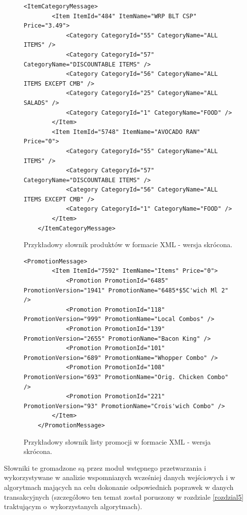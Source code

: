 \documentclass[a4paper]{book}
\begin{document}
\begin{figure}[t]
	\begin{lstlisting}[frame=single, breaklines=true]
	<ItemCategoryMessage>
		<Item ItemId="484" ItemName="WRP BLT CSP" Price="3.49">
			<Category CategoryId="55" CategoryName="ALL ITEMS" />
			<Category CategoryId="57" CategoryName="DISCOUNTABLE ITEMS" />
			<Category CategoryId="56" CategoryName="ALL ITEMS EXCEPT CMB" />
			<Category CategoryId="25" CategoryName="ALL SALADS" />
			<Category CategoryId="1" CategoryName="FOOD" />
		</Item>
		<Item ItemId="5748" ItemName="AVOCADO RAN" Price="0">
			<Category CategoryId="55" CategoryName="ALL ITEMS" />
			<Category CategoryId="57" CategoryName="DISCOUNTABLE ITEMS" />
			<Category CategoryId="56" CategoryName="ALL ITEMS EXCEPT CMB" />
			<Category CategoryId="1" CategoryName="FOOD" />
		</Item>
	</ItemCategoryMessage>
	\end{lstlisting}
	\caption{Przykładowy słownik produktów w formacie XML - wersja skrócona.}
	\label{lst:przykladowySlownikProduktow}
\end{figure}

\begin{figure}[t]
	\begin{lstlisting}[frame=single, breaklines=true]
	<PromotionMessage>
		<Item ItemId="7592" ItemName="Items" Price="0">
			<Promotion PromotionId="6485" PromotionVersion="1941" PromotionName="6485*$5C'wich Ml 2" />
			<Promotion PromotionId="118" PromotionVersion="999" PromotionName="Local Combos" />
			<Promotion PromotionId="139" PromotionVersion="2655" PromotionName="Bacon King" />
			<Promotion PromotionId="101" PromotionVersion="689" PromotionName="Whopper Combo" />
			<Promotion PromotionId="108" PromotionVersion="693" PromotionName="Orig. Chicken Combo" />
			<Promotion PromotionId="221" PromotionVersion="93" PromotionName="Crois'wich Combo" />
		</Item>
	</PromotionMessage>
	\end{lstlisting}
	\caption{Przykładowy słownik listy promocji w formacie XML - wersja skrócona.}
	\label{lst:przykladowySlownikPromocji}
\end{figure}
Słowniki te gromadzone są przez moduł wstępnego przetwarzania i wykorzystywane w analizie wspomnianych wcześniej danych wejściowych i w algorytmach mających na celu dokonanie odpowiednich poprawek w danych transakcyjnych (szczegółowo ten temat został poruszony w rozdziale \ref{rozdzial5} traktującym o~wykorzystanych algorytmach).
\end{document}
